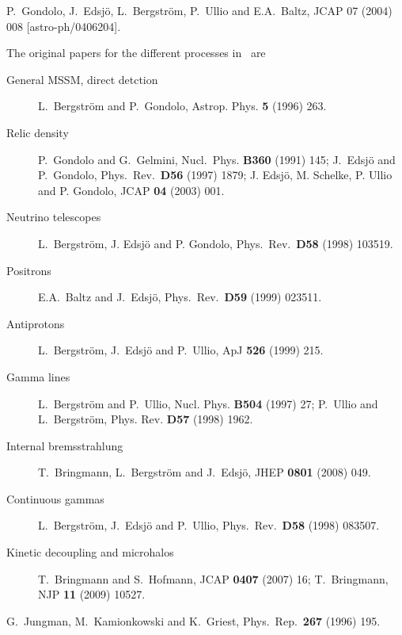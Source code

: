 

\begin{thebibliography}{99}
  
  P.~Gondolo, J.~Edsj{\"o}, L.~Bergstr{\"o}m, P.~Ullio and E.A.~Baltz,
  JCAP 07 (2004) 008 [astro-ph/0406204]. 

  The original papers for the different processes in \ds\ are\\
  \begin{description}
    \item[General MSSM, direct detction] L.~Bergstr{\"o}m and
      P.~Gondolo, Astrop. Phys. {\bfseries 5} (1996) 263.
    \item[Relic density] P.~Gondolo and G.~Gelmini, Nucl.\ Phys. 
         {\bfseries B360} (1991) 145; J.~Edsj{\"o} and P.~Gondolo, 
         Phys.\ Rev.\ {\bfseries D56} (1997) 1879; J. Edsj\"o, 
         M. Schelke, P. Ullio and P. Gondolo, JCAP {\bfseries 04} (2003) 001.
    \item[Neutrino telescopes]
       L.~Bergstr{\"o}m, J. Edsj{\"o} and P. Gondolo, Phys.\ Rev.\
      {\bfseries D58} (1998) 103519.
    \item[Positrons]
      E.A.~Baltz and J.~Edsj{\"o}, Phys.\ Rev.\ {\bfseries D59} (1999) 023511.
    \item[Antiprotons]
      L.~Bergstr{\"o}m, J.~Edsj{\"o} and P.~Ullio, ApJ {\bfseries 526} (1999) 215.
    \item[Gamma lines]
      L.~Bergstr{\"o}m and P.~Ullio, Nucl. Phys. {\bfseries B504} (1997) 27;
    P.~Ullio and L.~Bergstr\"om, Phys. Rev. {\bfseries D57} (1998) 1962.
    \item[Internal bremsstrahlung]
      T.~Bringmann, L.~Bergstr{\"o}m and J.~Edsj{\"o}, JHEP {\bfseries 0801} (2008) 049.
    \item[Continuous gammas]
      L.~Bergstr{\"o}m, J.~Edsj{\"o} and P.~Ullio, Phys.\ Rev.\ {\bfseries D58} (1998) 083507.
    \item[Kinetic decoupling and microhalos]
      T.~Bringmann and S.~Hofmann, JCAP {\bfseries 0407} (2007) 16; 
      T.~Bringmann, NJP {\bfseries 11} (2009) 10527.
  \end{description}

 G.~Jungman, M.~Kamionkowski and K.~Griest, Phys.\ Rep.\
  {\bf 267} (1996) 195.


\end{thebibliography}
